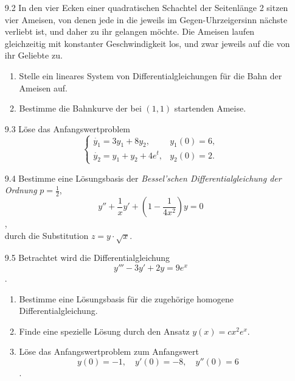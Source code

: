 \documentclass{HM}
\begin{document}
	\begin{enumerate}
		\item [9.2] In den vier Ecken einer quadratischen Schachtel der Seitenlänge 2 sitzen vier Ameisen, von denen jede in die jeweils im Gegen-Uhrzeigersinn nächste verliebt ist, und daher zu ihr gelangen möchte. Die Ameisen laufen gleichzeitig mit konstanter Geschwindigkeit los, und zwar jeweils auf die von ihr Geliebte zu.
		\begin{enumerate}
			\item Stelle ein lineares System von Differentialgleichungen für die Bahn der Ameisen auf.
			
			\item Bestimme die Bahnkurve der bei $(1,1)$ startenden Ameise.
		\end{enumerate}
		
		\item [9.3] Löse das Anfangswertproblem
		$$\begin{cases}
			\dot{y_1}=3y_1+8y_2,&y_1(0)=6,\\
			\dot{y_2}=y_1+y_2+4e^t,&y_2(0)=2.
		\end{cases}$$
		
		\item [9.4] Bestimme eine Lösungsbasis der \textit{Bessel'schen Differentialgleichung der Ordnung} $p=\frac{1}{2}$,
		$$y''+\frac{1}{x}y'+(1-\frac{1}{4x^2})y=0$$,\\
		durch die Substitution $z=y\cdot\sqrt{x}$.
		
		\item [9.5] Betrachtet wird die Differentialgleichung
		$$y'''-3y'+2y=9e^x$$.\\
		\begin{enumerate}
			\item Bestimme eine Lösungsbasis für die zugehörige homogene Differentialgleichung.
			
			\item Finde eine spezielle Lösung durch den Ansatz $y(x)=cx^2e^x$.
			
			\item Löse das Anfangswertproblem zum Anfangswert
			$$y(0)=-1,\quad y'(0)=-8,\quad y''(0)=6$$.
		\end{enumerate}
	\end{enumerate}
\end{document}
